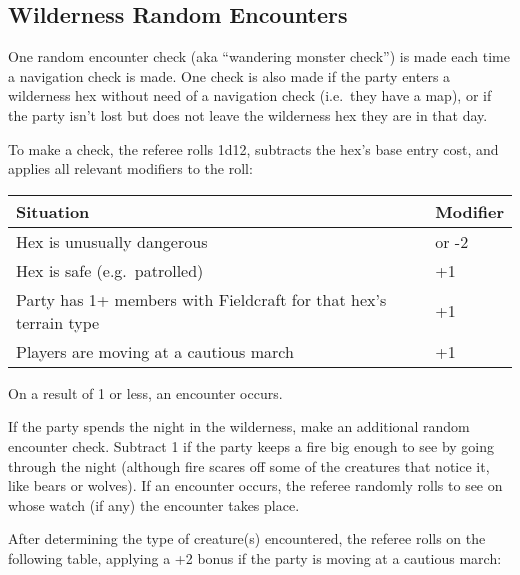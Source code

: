 \documentclass{article}
\begin{document}
\begin{multicols}{2}
\subsection{Wilderness Random
Encounters}\label{wilderness-random-encounters}

One random encounter check (aka ``wandering monster check'') is made
each time a navigation check is made. One check is also made if the
party enters a wilderness hex without need of a navigation check
(i.e.~they have a map), or if the party isn't lost but does not leave
the wilderness hex they are in that day.

To make a check, the referee rolls 1d12, subtracts the hex's base entry
cost, and applies all relevant modifiers to the roll:

\begin{longtable}[]{@{}
  >{\centering\arraybackslash}p{}
  >{\centering\arraybackslash}p{}@{}}
\toprule\noalign{}
\begin{minipage}[b]{\linewidth}\centering
Situation
\end{minipage} & \begin{minipage}[b]{\linewidth}\centering
Modifier
\end{minipage} \\
\midrule\noalign{}
\endhead
\bottomrule\noalign{}
\endlastfoot
Hex is unusually dangerous & -1 or -2 \\
Hex is safe (e.g.~patrolled) & +1 \\
Party has 1+ members with Fieldcraft for that hex's terrain type & +1 \\
Players are moving at a cautious march & +1 \\
\end{longtable}

On a result of 1 or less, an encounter occurs.

If the party spends the night in the wilderness, make an additional
random encounter check. Subtract 1 if the party keeps a fire big enough
to see by going through the night (although fire scares off some of the
creatures that notice it, like bears or wolves). If an encounter occurs,
the referee randomly rolls to see on whose watch (if any) the encounter
takes place.

After determining the type of creature(s) encountered, the referee rolls
on the following table, applying a +2 bonus if the party is moving at a
cautious march:


\end{multicols}
\end{document}
